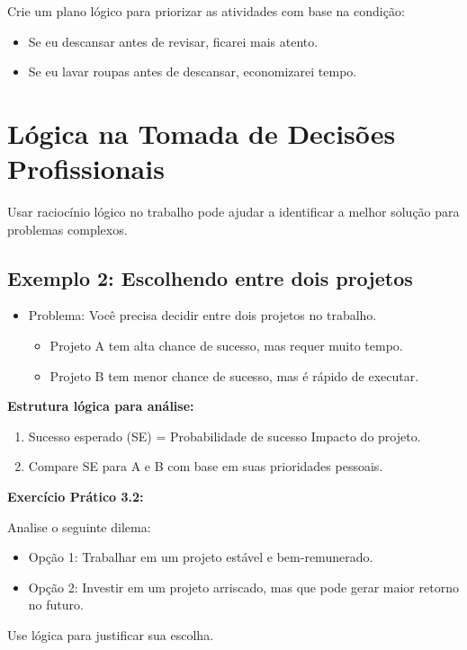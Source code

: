\documentclass[a4paper,12pt]{book}
\begin{document}
Crie um plano lógico para priorizar as atividades com base na condição:
\begin{itemize}
\item Se eu descansar antes de revisar, ficarei mais atento.
\item Se eu lavar roupas antes de descansar, economizarei tempo.
\end{itemize}

\section{Lógica na Tomada de Decisões Profissionais}

Usar raciocínio lógico no trabalho pode ajudar a identificar a melhor solução para problemas complexos.

\subsection*{Exemplo 2: Escolhendo entre dois projetos}
\begin{itemize}
\item Problema: Você precisa decidir entre dois projetos no trabalho.
\begin{itemize}
\item Projeto A tem alta chance de sucesso, mas requer muito tempo.
\item Projeto B tem menor chance de sucesso, mas é rápido de executar.
\end{itemize}
\end{itemize}

\textbf{Estrutura lógica para análise:}
\begin{enumerate}
\item Sucesso esperado (SE) = Probabilidade de sucesso  Impacto do projeto.
\item Compare SE para A e B com base em suas prioridades pessoais.
\end{enumerate}

\textbf{Exercício Prático 3.2:}

Analise o seguinte dilema:
\begin{itemize}
\item Opção 1: Trabalhar em um projeto estável e bem-remunerado.
\item Opção 2: Investir em um projeto arriscado, mas que pode gerar maior retorno no futuro.
\end{itemize}

Use lógica para justificar sua escolha.
\end{document}
